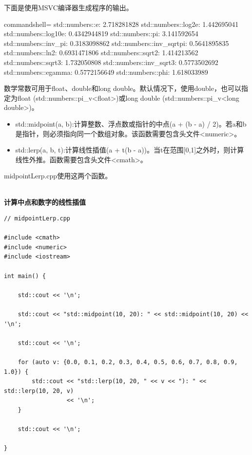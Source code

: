 下面是使用MSVC编译器生成程序的输出。

\begin{tcblisting}{commandshell={}}
std::numbers::e: 2.718281828
std::numbers::log2e: 1.442695041
std::numbers::log10e: 0.4342944819
std::numbers::pi: 3.141592654
std::numbers::inv_pi: 0.3183098862
std::numbers::inv_sqrtpi: 0.5641895835
std::numbers::ln2: 0.6931471806
std::numbers::sqrt2: 1.414213562
std::numbers::sqrt3: 1.732050808
std::numbers::inv_sqrt3: 0.5773502692
std::numbers::egamma: 0.5772156649
std::numbers::phi: 1.618033989
\end{tcblisting}

数学常数可用于float、double和long double。默认情况下，使用double，也可以指定为float (std::numbers::pi\_v<float>)或long double (std::numbers::pi\_v<long double>)。


\begin{itemize}
\item 
std::midpoint(a, b):计算整数、浮点数或指针的中点(a + (b - a) / 2)。若a和b是指针，则必须指向同一个数组对象。该函数需要包含头文件<numeric>。

\item 
std::lerp(a, b, t):计算线性插值(a + t(b - a))。当t在范围[0,1]之外时，则计算线性外推。函数需要包含头文件<cmath>。
\end{itemize}

midpointLerp.cpp使用这两个函数。

\hspace*{\fill} \\ %
\noindent
\textbf{计算中点和数字的线性插值}
\begin{lstlisting}[style=styleCXX]
// midpointLerp.cpp

#include <cmath>
#include <numeric>
#include <iostream>

int main() {
	
	std::cout << '\n';
	
	std::cout << "std::midpoint(10, 20): " << std::midpoint(10, 20) << '\n';
	
	std::cout << '\n';
	
	for (auto v: {0.0, 0.1, 0.2, 0.3, 0.4, 0.5, 0.6, 0.7, 0.8, 0.9, 1.0}) {
		std::cout << "std::lerp(10, 20, " << v << "): " << std::lerp(10, 20, v)
				  << '\n';
	}
	
	std::cout << '\n';
	
}
\end{lstlisting}

